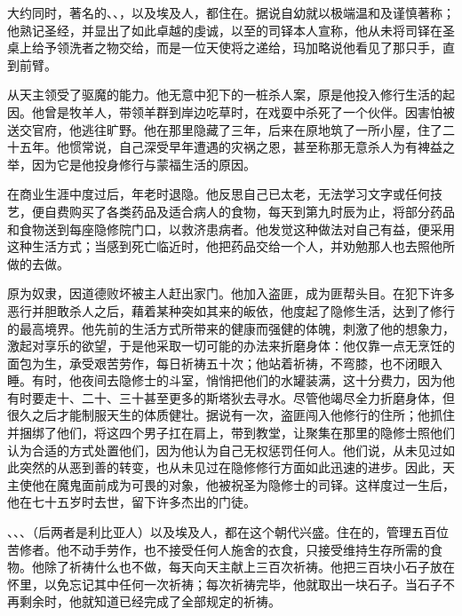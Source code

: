 大约同时，著名的、、，以及埃及人，都住在。据说自幼就以极端温和及谨慎著称；他熟记圣经，并显出了如此卓越的虔诚，以至的司铎本人宣称，他从未将司铎在圣桌上给予领洗者之物交给，而是一位天使将之递给，玛加略说他看见了那只手，直到前臂。\par

从天主领受了驱魔的能力。他无意中犯下的一桩杀人案，原是他投入修行生活的起因。他曾是牧羊人，带领羊群到岸边吃草时，在戏耍中杀死了一个伙伴。因害怕被送交官府，他逃往旷野。他在那里隐藏了三年，后来在原地筑了一所小屋，住了二十五年。他惯常说，自己深受早年遭遇的灾祸之恩，甚至称那无意杀人为有裨益之举，因为它是他投身修行与蒙福生活的原因。\par

在商业生涯中度过后，年老时退隐。他反思自己已太老，无法学习文字或任何技艺，便自费购买了各类药品及适合病人的食物，每天到第九时辰为止，将部分药品和食物送到每座隐修院门口，以救济患病者。他发觉这种做法对自己有益，便采用这种生活方式；当感到死亡临近时，他把药品交给一个人，并劝勉那人也去照他所做的去做。\par

原为奴隶，因道德败坏被主人赶出家门。他加入盗匪，成为匪帮头目。在犯下许多恶行并胆敢杀人之后，藉着某种突如其来的皈依，他度起了隐修生活，达到了修行的最高境界。他先前的生活方式所带来的健康而强健的体魄，刺激了他的想象力，激起对享乐的欲望，于是他采取一切可能的办法来折磨身体：他仅靠一点无烹饪的面包为生，承受艰苦劳作，每日祈祷五十次；他站着祈祷，不弯膝，也不闭眼入睡。有时，他夜间去隐修士的斗室，悄悄把他们的水罐装满，这十分费力，因为他有时要走十、二十、三十甚至更多的斯塔狄去寻水。尽管他竭尽全力折磨身体，但很久之后才能制服天生的体质健壮。据说有一次，盗匪闯入他修行的住所；他抓住并捆绑了他们，将这四个男子扛在肩上，带到教堂，让聚集在那里的隐修士照他们认为合适的方式处置他们，因为他认为自己无权惩罚任何人。他们说，从未见过如此突然的从恶到善的转变，也从未见过在隐修修行方面如此迅速的进步。因此，天主使他在魔鬼面前成为可畏的对象，他被祝圣为隐修士的司铎。这样度过一生后，他在七十五岁时去世，留下许多杰出的门徒。\par

、、、（后两者是利比亚人）以及埃及人，都在这个朝代兴盛。住在的，管理五百位苦修者。他不动手劳作，也不接受任何人施舍的衣食，只接受维持生存所需的食物。他除了祈祷什么也不做，每天向天主献上三百次祈祷。他把三百块小石子放在怀里，以免忘记其中任何一次祈祷；每次祈祷完毕，他就取出一块石子。当石子不再剩余时，他就知道已经完成了全部规定的祈祷。\par


